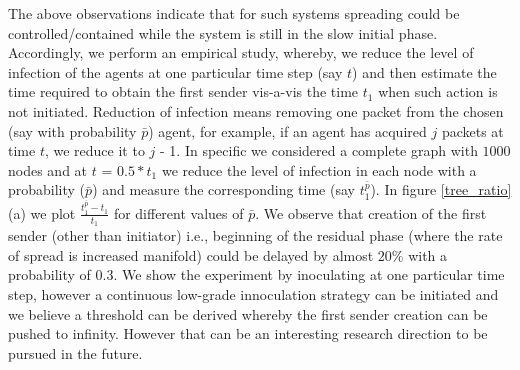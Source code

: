 The above observations indicate 
that for such systems spreading could be controlled/contained while the system is still in the slow initial phase. 
Accordingly, we perform an empirical study, whereby, we reduce the level of infection of the agents at one particular time step (say $t$) and then estimate the time required to obtain the first sender vis-a-vis the time $t_1$ when 
such action is not initiated. 
Reduction of infection means removing one packet from the chosen (say with probability $\bar p$)  agent, for example, if an agent has acquired $j$ packets at time $t$, we reduce it to $j$ - 1.  
In specific we considered a complete graph with $1000$ nodes and at $t$ =  $0.5 \ast t_1$  
we reduce the level of infection in each node with a probability ($\bar p$) and measure the corresponding time (say  $t_{1}^{\bar p}$). 
In figure \ref{tree_ratio}(a) we plot $\frac{t_{1}^{\bar p} - t_1}{t_1}$ for different values of $\bar p$. 
We observe that creation of the first sender (other than initiator) i.e.,
beginning of the residual phase (where the rate of spread is increased manifold) could be delayed by almost $20\%$ with a probability of $0.3$. 
We show the experiment by inoculating at one particular time step, however a continuous low-grade innoculation strategy can be
initiated and we believe a threshold can be derived whereby the first sender creation can be pushed to infinity. However that 
can be an interesting research direction to be pursued in the future.



